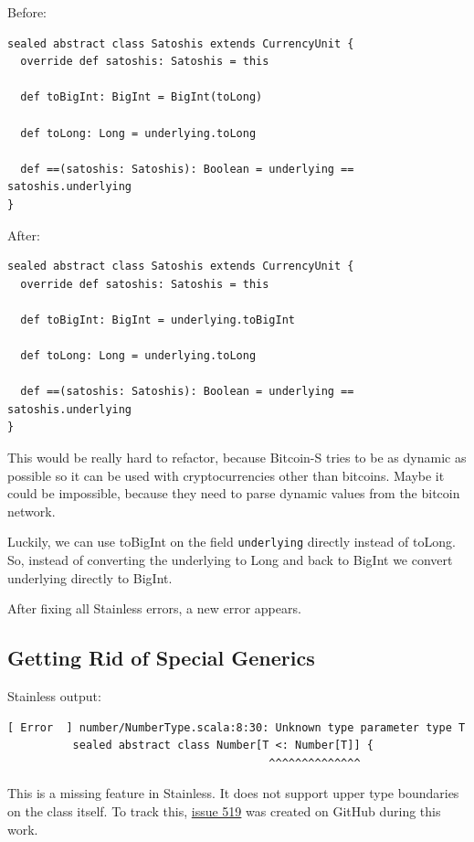 \documentclass[runningheads]{llncs}
\begin{document}
Before:
\begin{lstlisting}[style=scala]
sealed abstract class Satoshis extends CurrencyUnit {
  override def satoshis: Satoshis = this

  def toBigInt: BigInt = BigInt(toLong)

  def toLong: Long = underlying.toLong

  def ==(satoshis: Satoshis): Boolean = underlying == satoshis.underlying
}
\end{lstlisting}

After:
\begin{lstlisting}[style=scala]
sealed abstract class Satoshis extends CurrencyUnit {
  override def satoshis: Satoshis = this

  def toBigInt: BigInt = underlying.toBigInt

  def toLong: Long = underlying.toLong

  def ==(satoshis: Satoshis): Boolean = underlying == satoshis.underlying
}
\end{lstlisting}

This would be really hard to refactor, because Bitcoin-S tries to be as dynamic as possible so it can be used with cryptocurrencies other than bitcoins.
Maybe it could be impossible, because they need to parse dynamic values from the bitcoin network.

Luckily, we can use toBigInt on the field \texttt{underlying} directly instead of toLong.
So, instead of converting the underlying to Long and back to BigInt we convert underlying directly to BigInt.

After fixing all Stainless errors, a new error appears.


\subsection{Getting Rid of Special Generics}

Stainless output:
\begin{lstlisting}[style=stainless]
[ Error  ] number/NumberType.scala:8:30: Unknown type parameter type T
          sealed abstract class Number[T <: Number[T]] {
                                        ^^^^^^^^^^^^^^
\end{lstlisting}

This is a missing feature in Stainless.
It does not support upper type boundaries on the class itself.
To track this, \href{https://github.com/epfl-lara/stainless/issues/519}{issue 519} was created on GitHub during this work.
\end{document}
